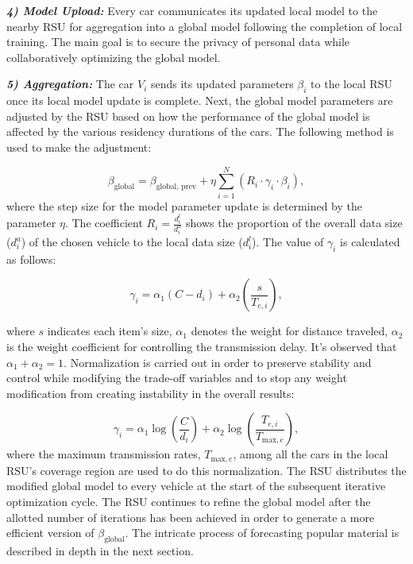 \documentclass[journal]{IEEEtran}
\begin{document}
\textbf{\textit{4) Model Upload:}} Every car communicates its updated local model to the nearby RSU for aggregation into a global model following the completion of local training. The main goal is to secure the privacy of personal data while collaboratively optimizing the global model.

\textbf{\textit{5) Aggregation:}} The car $V_i$ sends its updated parameters $\beta_i$ to the local RSU once its local model update is complete. Next, the global model parameters are adjusted by the RSU  based on how the performance of the global model is affected by the various residency durations of the cars. The following method is used to make the adjustment:

\begin{equation} \label{eq:9}
\beta_{\text{global}} = \beta_{\text{global, prev}} + \eta \sum_{i=1}^{N} (R_i \cdot \gamma_i \cdot \beta_i),
\end{equation}
where the step size for the model parameter update is determined by the parameter $\eta$. The coefficient $R_i = \frac{d_i^l}{d_i^a}$ shows the proportion of the overall data size ($d_i^a$) of the chosen vehicle to the local data size ($d_i^l$). The value of $\gamma_i$ is calculated as follows:

\begin{equation}
\gamma_i = \alpha_1 (C - d_i) + \alpha_2 \left( \frac{s}{T_{e, i}} \right),
\end{equation}

where $s$ indicates each item's size, $\alpha_1$ denotes the weight for distance traveled, $\alpha_2$ is the weight coefficient for controlling the transmission delay. It's observed that $\alpha_1 + \alpha_2 = 1$. Normalization is carried out in order to preserve stability and control while modifying the trade-off variables and to stop any weight modification from creating instability in the overall results:

\begin{equation}
\gamma_i = \alpha_1 \log\left( \frac{C}{d_i} \right) + \alpha_2 \log\left( \frac{T_{e, i}}{T_{\text{max}, e}} \right),
\end{equation}
where the maximum transmission rates, $T_{\text{max}, e}$, among all the cars in the local RSU's coverage region are used to do this normalization. The RSU distributes the modified global model to every vehicle at the start of the subsequent iterative optimization cycle. The RSU continues to refine the global model after the allotted number of iterations has been achieved in order to generate a more efficient version of $\beta_{\text{global}}$. The intricate process of forecasting popular material is described in depth in the next section.
\end{document}
